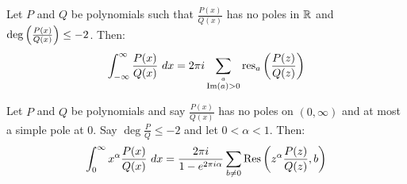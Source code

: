 \begin{theorem}
    Let $P$ and $Q$ be polynomials such that $\frac{P(x)}{Q(x)}$ has no poles in $\mathbb{R}$
    and $\deg \left( \frac{P(x)}{Q(x)} \right) \leq -2$. Then:
    \begin{align*}
        \int_{-\infty}^\infty \frac{P(x)}{Q(x)} \ dx = 2 \pi i \sum_{\stackrel{a}{\text{Im}(a) > 0}} \text{res}_a \left( \frac{P(z)}{Q(z)} \right)
    \end{align*}
\end{theorem}

\begin{theorem}
    Let $P$ and $Q$ be polynomials and say $\frac{P(x)}{Q(x)}$ has no poles on
    $(0,\infty)$ and at most a simple pole at $0$. Say $\deg \frac{P}{Q} \leq -2$
    and let $0<\alpha<1$. Then:
    \begin{align*}
        \int_0^\infty x^\alpha \frac{P(x)}{Q(x)} \ dx = \frac{2 \pi i}{1 - e^{2 \pi i \alpha}} \sum_{b \neq 0} \text{Res} \left( z^\alpha \frac{P(z)}{Q(z)} , b \right)
    \end{align*}
\end{theorem}

